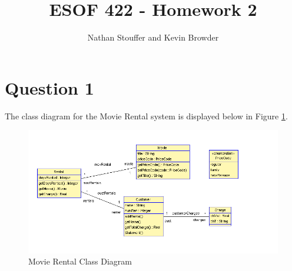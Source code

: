 \documentclass{article}
\begin{document}
	
\title{ESOF 422 - Homework 2}
\author{Nathan Stouffer and Kevin Browder}

\maketitle
\newpage

\section*{Question 1}

	The class diagram for the Movie Rental system is displayed below in Figure \ref{fig:q1class}.
	\begin{figure}[h]
		\includegraphics[width=\linewidth]{Q1Class.PNG}
		\caption{Movie Rental Class Diagram}
		\label{fig:q1class}
	\end{figure}
	
\end{document}
